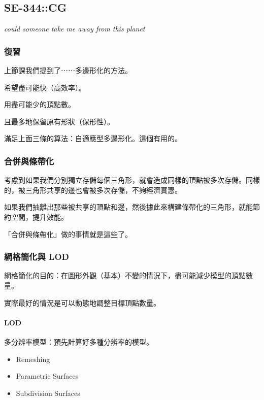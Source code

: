 \documentclass[
]{article}
\begin{document}
\hypertarget{header-n29}{%
\subsection{SE-344::CG}\label{header-n29}}

\emph{could someone take me away from this planet}

\hypertarget{header-n31}{%
\subsubsection{復習}\label{header-n31}}

上節課我們提到了⋯⋯多邊形化的方法。

希望盡可能快（高效率）。

用盡可能少的頂點數。

且最多地保留原有形狀（保形性）。

滿足上面三條的算法：自適應型多邊形化。這個有用的。

\hypertarget{header-n37}{%
\subsubsection{合併與條帶化}\label{header-n37}}

考慮到如果我們分別獨立存儲每個三角形，就會造成同樣的頂點被多次存儲。同樣的，被三角形共享的邊也會被多次存儲，不夠經濟實惠。

如果我們抽離出那些被共享的頂點和邊，然後據此來構建條帶化的三角形，就能節約空間，提升效能。

「合併與條帶化」做的事情就是這些了。

\hypertarget{header-n41}{%
\subsubsection{網格簡化與 LOD}\label{header-n41}}

網格簡化的目的：在圖形外觀（基本）不變的情況下，盡可能減少模型的頂點數量。

實際最好的情況是可以動態地調整目標頂點數量。

\hypertarget{header-n44}{%
\paragraph{LOD}\label{header-n44}}

多分辨率模型：預先計算好多種分辨率的模型。

\begin{itemize}
\item
  Remeshing
\item
  Parametric Surfaces
\item
  Subdivision Surfaces
\end{itemize}
\end{document}
